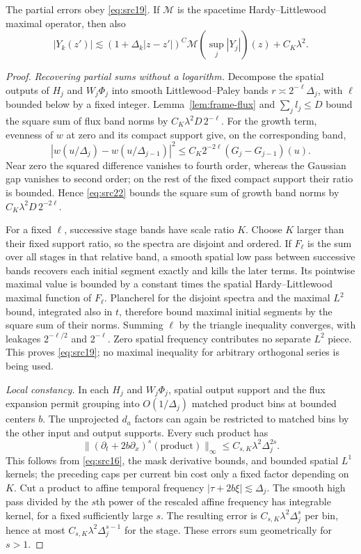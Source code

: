\begin{lemma}
\label{lem:frame-maximal}
The partial errors obey \eqref{eq:src19}.  If $\mathcal M$ is the
spacetime Hardy--Littlewood maximal operator, then also
\begin{equation}\label{eq:src23}
 |Y_k(z')|\lesssim
 (1+\Delta_k|z-z'|)^C\mathcal M(\sup_j|Y_j|)(z)+C_K\lambda^2.
\end{equation}
\end{lemma}

\begin{proof}
\emph{Recovering partial sums without a logarithm.}
Decompose the spatial outputs of $H_j$ and $W_j\Phi_j$ into smooth
Littlewood--Paley bands $r\asymp2^{-\ell}\Delta_j$, with $\ell$
bounded below by a fixed integer.  Lemma~\ref{lem:frame-flux} and
$\sum_jl_j\leq D$ bound the square sum of flux band norms by
$C_K\lambda^2D\,2^{-\ell}$.
For the growth term, evenness of $w$ at zero and its compact support
give, on the corresponding band,
\[
 |w(u/\Delta_j)-w(u/\Delta_{j-1})|^2
 \leq C_K2^{-2\ell}(G_j-G_{j-1})(u).
\]
Near zero the squared difference vanishes to fourth order, whereas
the Gaussian gap vanishes to second order; on the rest of the fixed
compact support their ratio is bounded.  Hence
\eqref{eq:src22} bounds the square sum of growth band norms by
$C_K\lambda^2D\,2^{-2\ell}$.

For a fixed $\ell$, successive stage bands have scale ratio $K$.
Choose $K$ larger than their fixed support ratio, so the spectra are
disjoint and ordered.  If $F_\ell$ is the sum over all stages in that
relative band, a smooth spatial low pass between successive bands
recovers each initial segment exactly and kills the later terms.
Its pointwise maximal value is bounded by a constant times the
spatial Hardy--Littlewood maximal function of $F_\ell$.
Plancherel for the disjoint spectra and the maximal $L^2$ bound,
integrated also in $t$, therefore bound maximal initial segments by
the square sum of their norms.  Summing $\ell$ by the triangle
inequality converges, with leakages $2^{-\ell/2}$ and $2^{-\ell}$.
Zero spatial frequency contributes no separate $L^2$ piece.
This proves \eqref{eq:src19}; no maximal inequality for arbitrary
orthogonal series is being used.

\emph{Local constancy.}
In each $H_j$ and $W_j\Phi_j$, spatial output support and the flux
expansion permit grouping into $O(1/\Delta_j)$ matched product bins
at bounded centers $b$.  The unprojected $d_a$ factors can again be
restricted to matched bins by the other input and output supports.
Every such product has
\[
 \| (\partial_t+2b\partial_x)^s(\text{product})\|_\infty
 \leq C_{s,K}\lambda^2\Delta_j^{2s}.
\]
This follows from \eqref{eq:src16}, the mask derivative bounds,
and bounded spatial $L^1$ kernels; the preceding caps per current
bin cost only a fixed factor depending on $K$.
Cut a product to affine temporal frequency
$|\tau+2b\xi|\lesssim\Delta_j$.  The smooth high pass divided by
the $s$th power of the rescaled affine frequency has integrable
kernel, for a fixed sufficiently large $s$.  The resulting error
is $C_{s,K}\lambda^2\Delta_j^s$ per bin, hence at most
$C_{s,K}\lambda^2\Delta_j^{s-1}$ for the stage.  These errors sum
geometrically for $s>1$.


\end{proof}
